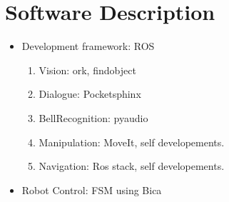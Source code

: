 \documentclass[citeauthoryear]{llncs}
\begin{document}
\section{Software Description}

\begin{itemize}
 \item Development framework: ROS
  \begin{enumerate}
   \item Vision: ork, findobject
   \item Dialogue: Pocketsphinx
   \item BellRecognition:  pyaudio 
   \item Manipulation: MoveIt, self developements.
   \item Navigation: Ros stack, self developements.
  \end{enumerate}

  \item Robot Control: FSM using Bica 
\end{itemize}
\end{document}
